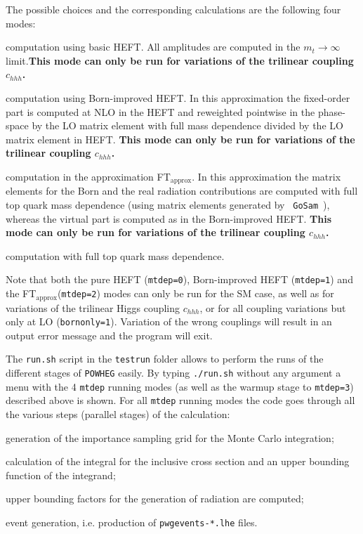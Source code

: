 \documentclass[paper]{JHEP3}
\newcommand\POWHEG{{\tt POWHEG}}
\newcommand\ftapprox{FT$_{\mathrm{approx}}$\xspace}
\renewenvironment{description}[1][0pt]
  {\list{}{\labelwidth=0pt \leftmargin=#1
   \let\makelabel\descriptionlabel}}
  {\endlist}
\begin{document}
The possible choices and the corresponding calculations are the following four modes:
\begin{description}[.3in]
 \item[{\tt mtdep=0}:]{computation using basic HEFT. All amplitudes
   are computed in the $m_t\to\infty$ limit.\textbf{This mode can only be run for variations of 
   the trilinear coupling $c_{hhh}$.}}
 \item[{\tt mtdep=1}:]{computation using Born-improved HEFT. In this
   approximation the fixed-order part is computed at NLO in the HEFT
   and reweighted pointwise in the phase-space by the LO matrix
   element with full mass dependence divided by the LO matrix
   element in HEFT. \textbf{This mode can only be run for variations of 
   the trilinear coupling $c_{hhh}$.}}
 \item[{\tt mtdep=2}:]{computation in the approximation \ftapprox. In
   this approximation the matrix elements for the Born and the real
   radiation contributions are computed with full top quark mass dependence
   (using matrix elements generated by {\tt
     GoSam}~\cite{Cullen:2014yla}), whereas the virtual part is
   computed as in the Born-improved HEFT. \textbf{This mode can only be run for variations of 
   the trilinear coupling $c_{hhh}$.}}
 \item[{\tt mtdep=3}:]{computation with full top quark mass dependence.}
\end{description}

Note that both the pure HEFT ({\tt mtdep=0}), Born-improved HEFT ({\tt mtdep=1}) and the \ftapprox ({\tt mtdep=2}) modes can only be run for the
SM case, as well as for variations of the trilinear Higgs coupling $c_{hhh}$, or for all coupling variations but only at LO ({\tt bornonly=1}). Variation of the wrong couplings will result in an output error message and the program will exit.

The {\tt run.sh} script in the {\tt testrun} folder allows to perform 
the runs of the different stages of \POWHEG{} easily.
By typing {\tt ./run.sh} without any argument a menu with the
4 {\tt mtdep} running modes (as well as the warmup stage to {\tt mtdep=3}) described above is shown. 
For all {\tt mtdep} running modes the code goes through all
the various steps (parallel stages) of the calculation: 
\begin{description}[.3in]
 \item[{\tt parallelstage=1}:]
generation of the importance sampling grid for the Monte Carlo integration; 
 \item[{\tt parallelstage=2}:] calculation of the integral for the inclusive cross section and an upper bounding function of the integrand;
 \item[{\tt parallelstage=3}:] upper bounding factors for the generation of radiation are computed;
 \item[{\tt parallelstage=4}:] event generation, i.e. production of {\tt pwgevents-*.lhe} files.
\end{description}
\end{document}
